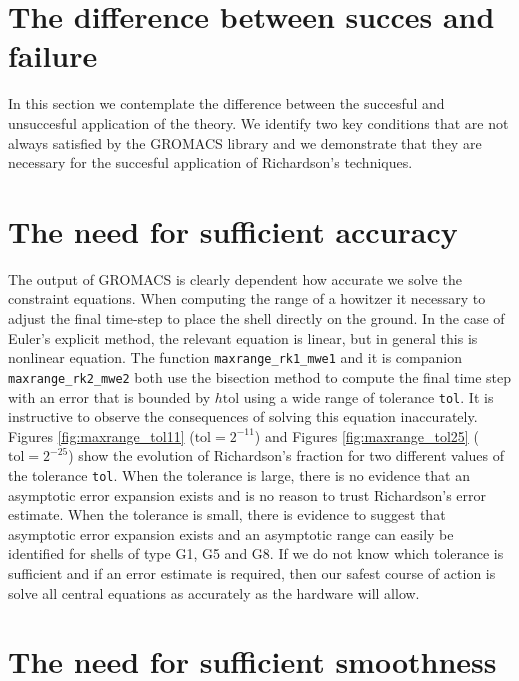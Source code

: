 \documentclass[runningheads]{llncs}
\begin{document}
\section{The difference between succes and failure}

In this section we contemplate the difference between the succesful and unsuccesful application of the theory. We identify two key conditions that are not always satisfied by the GROMACS library and we demonstrate that they are necessary for the succesful application of Richardson's techniques.

\section{The need for sufficient accuracy}

The output of GROMACS is clearly dependent how accurate we solve the constraint equations. When computing the range of a howitzer it necessary to adjust the final time-step to place the shell directly on the ground. In the case of Euler's explicit method, the relevant equation is linear, but in general this is nonlinear equation. The function {\tt maxrange\_rk1\_mwe1} and it is companion {\tt maxrange\_rk2\_mwe2} both use the bisection method to compute the final time step with an error that is bounded by $h \text{tol}$ using a wide range of tolerance {\tt tol}. It is instructive to observe the consequences of solving this equation inaccurately. Figures \ref{fig:maxrange_tol11} ($\text{tol} = 2^{-11}$) and Figures \ref{fig:maxrange_tol25} ($\text{tol} = 2^{-25}$) show the evolution of Richardson's fraction for two different values of the tolerance {\tt tol}. When the tolerance is large, there is no evidence that an asymptotic error expansion exists and is no reason to trust Richardson's error estimate. When the tolerance is small, there is evidence to suggest that asymptotic error expansion exists and an asymptotic range can easily be identified for shells of type G1, G5 and G8. If we do not know which tolerance is sufficient and if an error estimate is required, then our safest course of action is solve all central equations as accurately as the hardware will allow.

\section{The need for sufficient smoothness}
\end{document}
